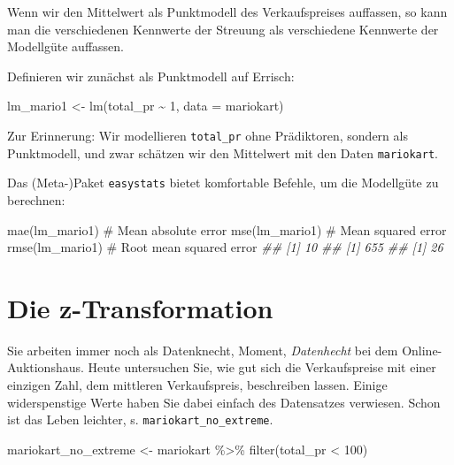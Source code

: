 \documentclass[
  letterpaper,
  twoside,
  open=any]{scrbook}
\newenvironment{Shaded}{\begin{snugshade}}{\end{snugshade}}
\newcommand{\AttributeTok}[1]{\textcolor[rgb]{0.40,0.45,0.13}{#1}}
\newcommand{\CommentTok}[1]{\textcolor[rgb]{0.37,0.37,0.37}{#1}}
\newcommand{\DecValTok}[1]{\textcolor[rgb]{0.68,0.00,0.00}{#1}}
\newcommand{\DocumentationTok}[1]{\textcolor[rgb]{0.37,0.37,0.37}{\textit{#1}}}
\newcommand{\FunctionTok}[1]{\textcolor[rgb]{0.28,0.35,0.67}{#1}}
\newcommand{\NormalTok}[1]{\textcolor[rgb]{0.00,0.23,0.31}{#1}}
\newcommand{\OtherTok}[1]{\textcolor[rgb]{0.00,0.23,0.31}{#1}}
\newcommand{\SpecialCharTok}[1]{\textcolor[rgb]{0.37,0.37,0.37}{#1}}
\theoremstyle{definition}
\theoremstyle{definition}
\theoremstyle{definition}
\theoremstyle{remark}
\begin{document}
Wenn wir den Mittelwert als Punktmodell des Verkaufspreises auffassen,
so kann man die verschiedenen Kennwerte der Streuung als verschiedene
Kennwerte der Modellgüte auffassen.

Definieren wir zunächst als Punktmodell auf Errisch:

\begin{Shaded}
\begin{Highlighting}[]
\NormalTok{lm\_mario1 }\OtherTok{\textless{}{-}} \FunctionTok{lm}\NormalTok{(total\_pr }\SpecialCharTok{\textasciitilde{}} \DecValTok{1}\NormalTok{, }\AttributeTok{data =}\NormalTok{ mariokart)}
\end{Highlighting}
\end{Shaded}

Zur Erinnerung: Wir modellieren \texttt{total\_pr} ohne Prädiktoren,
sondern als Punktmodell, und zwar schätzen wir den Mittelwert mit den
Daten \texttt{mariokart}.

Das (Meta-)Paket \texttt{easystats} bietet komfortable Befehle, um die
Modellgüte zu berechnen:

\begin{Shaded}
\begin{Highlighting}[]
\FunctionTok{mae}\NormalTok{(lm\_mario1)  }\CommentTok{\# Mean absolute error}
\FunctionTok{mse}\NormalTok{(lm\_mario1)  }\CommentTok{\# Mean squared error}
\FunctionTok{rmse}\NormalTok{(lm\_mario1)  }\CommentTok{\# Root mean squared error}
\DocumentationTok{\#\# [1] 10}
\DocumentationTok{\#\# [1] 655}
\DocumentationTok{\#\# [1] 26}
\end{Highlighting}
\end{Shaded}

\section{Die z-Transformation}\label{die-z-transformation}

Sie arbeiten immer noch als Datenknecht, Moment, \emph{Datenhecht} bei
dem Online-Auktionshaus. Heute untersuchen Sie, wie gut sich die
Verkaufspreise mit einer einzigen Zahl, dem mittleren Verkaufspreis,
beschreiben lassen. Einige widerspenstige Werte haben Sie dabei einfach
des Datensatzes verwiesen. Schon ist das Leben leichter, s.
\texttt{mariokart\_no\_extreme}.

\begin{Shaded}
\begin{Highlighting}[]
\NormalTok{mariokart\_no\_extreme }\OtherTok{\textless{}{-}} 
\NormalTok{  mariokart }\SpecialCharTok{\%\textgreater{}\%} 
  \FunctionTok{filter}\NormalTok{(total\_pr }\SpecialCharTok{\textless{}} \DecValTok{100}\NormalTok{)}
\end{Highlighting}
\end{Shaded}
\end{document}
